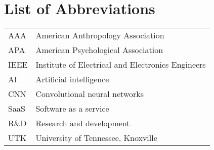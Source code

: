 \chapter*{List of Abbreviations} \label{abbreviations}

\hspace*{-0.6in}
\begin{tabular}{@{}C{1in} L{5.25in}}
AAA & American Anthropology Association \\
APA & American Psychological Association \\
IEEE & Institute of Electrical and Electronics Engineers \\
AI & Artificial intelligence \\
CNN & Convolutional neural networks \\
SaaS & Software as a service \\
R\&D & Research and development \\
UTK & University of Tennessee, Knoxville \\
\end{tabular}
